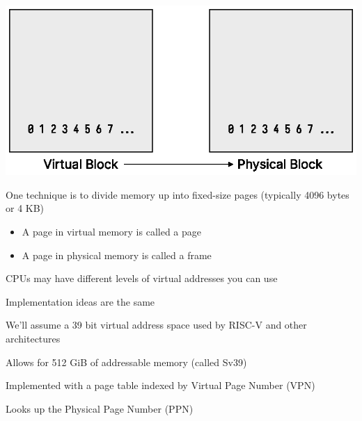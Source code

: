 \begin{slide}
    

    \centering
    \includegraphics{virt-to-phy-block.eps}

\end{slide}
  
\begin{slide}


    One technique is to divide memory up into fixed-size pages (typically 4096 bytes or 4 KB)
	\begin{itemize}
		\item A page in virtual memory is called a page
		\item A page in physical memory is called a frame
	\end{itemize}
	
\end{slide}

\begin{slide}


    CPUs may have different levels of virtual addresses you can use

    \leftspace{}Implementation ideas are the same
    \medskip

    We'll assume a 39 bit virtual address space used by RISC-V and other
    architectures

    \leftspace{}Allows for 512 GiB of addressable memory (called Sv39)
    \medskip

    Implemented with a page table indexed by Virtual Page Number (VPN)

    \leftspace{}Looks up the Physical Page Number (PPN)

\end{slide}

